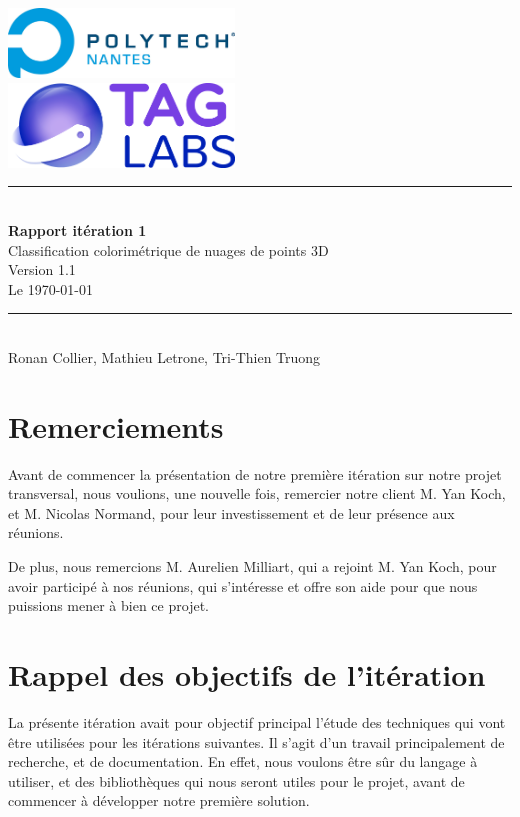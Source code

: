 \documentclass[12pt,titlepage,french]{article}
\begin{document}

\begin{titlepage}
\newcommand{\HRule}{\rule{\linewidth}{0.5mm}}
\center

  \includegraphics[width=0.45\textwidth]{../../ressources/img_logos/logo_polytech.png}\\[1cm]

  \includegraphics[width=0.45\textwidth]{../../ressources/img_logos/logo_taglabs.png}


\HRule \\[0.4cm]
{ \huge \bfseries Rapport itération 1\\[0.15cm] }
Classification colorimétrique de nuages de points 3D\\
Version 1.1\\
Le \today \\
\HRule \\[1.5cm]
Ronan Collier,
Mathieu Letrone,
Tri-Thien Truong
\\[1cm]
\end{titlepage}

\tableofcontents %
\newpage

\section{Remerciements}

Avant de commencer la présentation de notre première itération sur notre projet transversal, nous voulions, une nouvelle fois, remercier notre client M. Yan Koch, et M. Nicolas Normand, pour leur investissement et de leur présence aux réunions.

De plus, nous remercions M. Aurelien Milliart, qui a rejoint M. Yan Koch, pour avoir participé à nos réunions, qui s'intéresse et offre son aide pour que nous puissions mener à bien ce projet.

\section{Rappel des objectifs de l'itération}
La présente itération avait pour objectif principal l'étude des techniques qui vont être utilisées pour les itérations suivantes.
Il s'agit d'un travail principalement de recherche, et de documentation. En effet, nous voulons être sûr du langage à utiliser, et des bibliothèques qui nous seront utiles pour le projet, avant de commencer à développer notre première solution.
\end{document}
